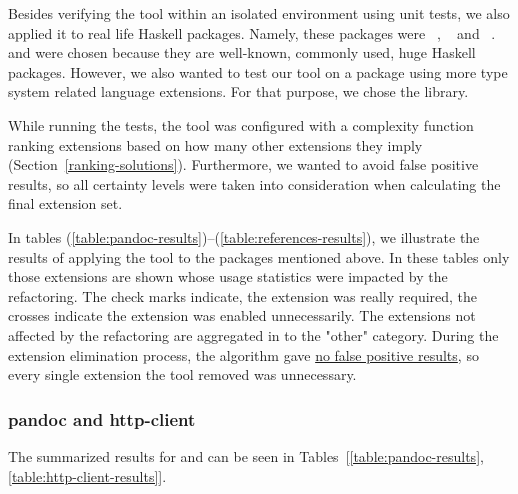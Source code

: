 \documentclass[main.tex]{subfiles}
\begin{document}
	
	\newcommand{\mc}[3]{\multicolumn{#1}{#2}{#3}}
	\newcommand{\required}{\mc{1}{c|}{\cmark}}
	\newcommand{\unused}  {\mc{1}{c||}{\xmark}}
	
	Besides verifying the tool within an isolated environment using unit tests, we also applied it to real life Haskell packages. Namely, these packages were ~\cite{pandoc}, ~\cite{http-client} and ~\cite{references-bib}.  and  were chosen because they are well-known, commonly used, huge Haskell packages. However, we also wanted to test our tool on a package using more type system related language extensions. For that purpose, we chose the  library.
	
	While running the tests, the tool was configured with a complexity function ranking extensions based on how many other extensions they imply (Section~\ref{ranking-solutions}). Furthermore, we wanted to avoid false positive results, so all certainty levels were taken into consideration when calculating the final extension set.
	
	In tables (\ref{table:pandoc-results})--(\ref{table:references-results}), we illustrate the results of applying the tool to the packages mentioned above. In these tables only those extensions are shown whose usage statistics were impacted by the refactoring. The check marks indicate, the extension was really required, the crosses indicate the extension was enabled unnecessarily. The extensions not affected by the refactoring are aggregated in to the "other" category. During the extension elimination process, the algorithm gave \underline{no false positive results}, so every single extension the tool removed was unnecessary.
	
	\subsubsection{pandoc and http-client}
	
	The summarized results for  and  can be seen in Tables~[\ref{table:pandoc-results},\ref{table:http-client-results}].
	
\end{document}
